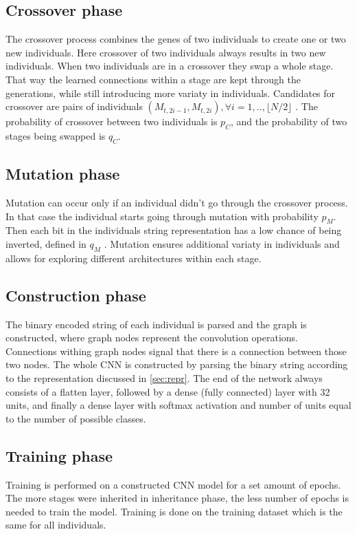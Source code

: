 \documentclass[eng]{simposium}
\begin{document}
\subsection{Crossover phase}
The crossover process combines the genes of two individuals to create one or two new individuals.
Here crossover of two individuals always results in two new individuals.
When two individuals are in a crossover they swap a whole stage.
That way the learned connections within a stage are kept through the generations, while still introducing more variaty in individuals.
Candidates for crossover are pairs of individuals $(M_{t,2i-1}, M_{t,2i}), \forall i=1,..,\lfloor N/2\rfloor $ \cite{4}.
The probability of crossover between two individuals is $p_C$, and the probability of two stages being swapped is $q_C$.

\subsection{Mutation phase}
Mutation can occur only if an individual didn't go through the crossover process.
In that case the individual starts going through mutation with probability $p_M$.
Then each bit in the individuals string representation has a low chance of being inverted, defined in $q_M$ \cite{4}.
Mutation ensures additional variaty in individuals and allows for exploring different architectures within each stage.

\subsection{Construction phase}
The binary encoded  string of each individual is parsed and the graph is constructed, where graph nodes represent the convolution operations.
Connections withing graph nodes signal that there is a connection between those two nodes.
The whole CNN is constructed by parsing the binary string according to the representation discussed in \ref{sec:repr}. 
The end of the network always consists of a flatten layer, followed by a dense (fully connected) layer with 32 units, and finally a dense 
layer with softmax activation and number of units equal to the number of possible classes.

\subsection{Training phase}
Training is performed on a constructed CNN model for a set amount of epochs. 
The more stages were inherited in inheritance phase, the less number of epochs is needed to train the model.
Training is done on the training dataset which is the same for all individuals.
\end{document}
